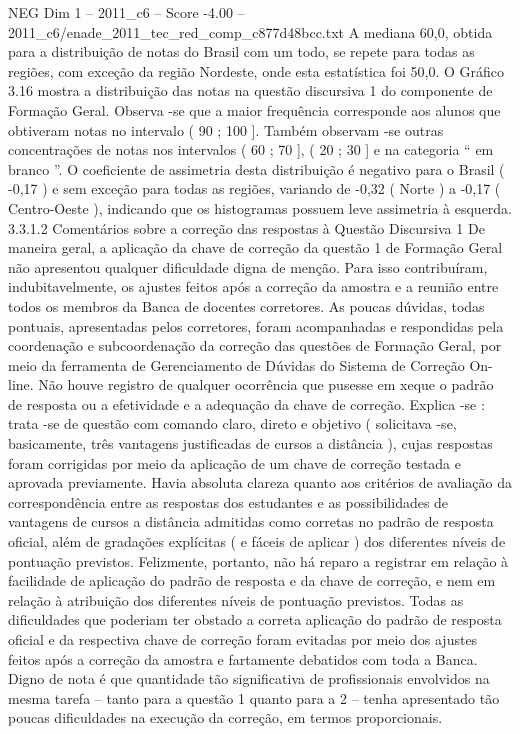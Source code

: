 \begin{textsample}{NEG Dim 1 – 2011\_c6 – Score -4.00 – 2011\_c6/enade\_2011\_tec\_red\_comp\_c877d48bcc.txt}
A mediana 60,0, obtida para a distribuição de notas do Brasil com um todo, se repete para todas as regiões, com exceção da região Nordeste, onde esta estatística foi 50,0.
O Gráfico 3.16 mostra a distribuição das notas na questão discursiva 1 do componente de Formação Geral.
Observa -se que a maior frequência corresponde aos alunos que obtiveram notas no intervalo ( 90 ; 100 ].
Também observam -se outras concentrações de notas nos intervalos ( 60 ; 70 ], ( 20 ; 30 ] e na categoria “ em branco ”.
O coeficiente de assimetria desta distribuição é negativo para o Brasil ( -0,17 ) e sem exceção para todas as regiões, variando de -0,32 ( Norte ) a -0,17 ( Centro-Oeste ), indicando que os histogramas possuem leve assimetria à esquerda. 3.3.1.2 Comentários sobre a correção das respostas à Questão Discursiva 1 De maneira geral, a aplicação da chave de correção da questão 1 de Formação Geral não apresentou qualquer dificuldade digna de menção.
Para isso contribuíram, indubitavelmente, os ajustes feitos após a correção da amostra e a reunião entre todos os membros da Banca de docentes corretores.
As poucas dúvidas, todas pontuais, apresentadas pelos corretores, foram acompanhadas e respondidas pela coordenação e subcoordenação da correção das questões de Formação Geral, por meio da ferramenta de Gerenciamento de Dúvidas do Sistema de Correção On-line.
Não houve registro de qualquer ocorrência que pusesse em xeque o padrão de resposta ou a efetividade e a adequação da chave de correção.
Explica -se : trata -se de questão com comando claro, direto e objetivo ( solicitava -se, basicamente, três vantagens justificadas de cursos a distância ), cujas respostas foram corrigidas por meio da aplicação de um chave de correção testada e aprovada previamente.
Havia absoluta clareza quanto aos critérios de avaliação da correspondência entre as respostas dos estudantes e as possibilidades de vantagens de cursos a distância admitidas como corretas no padrão de resposta oficial, além de gradações explícitas ( e fáceis de aplicar ) dos diferentes níveis de pontuação previstos.
Felizmente, portanto, não há reparo a registrar em relação à facilidade de aplicação do padrão de resposta e da chave de correção, e nem em relação à atribuição dos diferentes níveis de pontuação previstos.
Todas as dificuldades que poderiam ter obstado a correta aplicação do padrão de resposta oficial e da respectiva chave de correção foram evitadas por meio dos ajustes feitos após a correção da amostra e fartamente debatidos com toda a Banca.
Digno de nota é que quantidade tão significativa de profissionais envolvidos na mesma tarefa – tanto para a questão 1 quanto para a 2 – tenha apresentado tão poucas dificuldades na execução da correção, em termos proporcionais.

\end{textsample}
